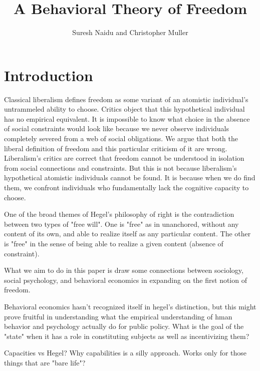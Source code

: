 \documentclass[10pt,a4paper]{article}
\title{A Behavioral Theory of Freedom}
\author{Suresh Naidu and Christopher Muller}
\begin{document}
\maketitle

\begin{abstract}
\end{abstract}

\setcounter{page}{0}
\thispagestyle{empty}

\renewcommand{\baselinestretch}{1.4}\large\normalsize

\section*{Introduction}

\noindent Classical liberalism defines freedom as some variant of an atomistic individual's untrammeled ability to choose. Critics object that this hypothetical individual has no empirical equivalent. It is impossible to know what choice in the absence of social constraints would look like because we never observe individuals completely severed from a web of social obligations. We argue that both the liberal definition of freedom and this particular criticism of it are wrong. Liberalism's critics are correct that freedom cannot be understood in isolation from social connections and constraints. But this is not because liberalism's hypothetical atomistic individuals cannot be found. It is because when we do find them, we confront individuals who fundamentally lack the cognitive capacity to choose. 

One of the broad themes of Hegel's philosophy of right is the contradiction between two types of "free will".
One is "free" as in unanchored, without any content of its own, and able to realize itself as any particular content.
The other is "free" in the sense of being able to realize a given content (absence of constraint).

What we aim to do in this paper is draw some connections between sociology, social psychology, and behavioral economics 
in expanding on the first notion of freedom. 

Behavioral economics hasn't recognized itself in hegel's distinction, but this might prove fruitful in understanding what the empirical
understanding of hman behavior and psychology actually do for public policy. What is the goal of the "state" when it has a role in constituting subjects
as well as incentivizing them?

Capacities vs Hegel? Why capabilities is a silly approach. Works only for those things that are "bare life"?
\end{document}
